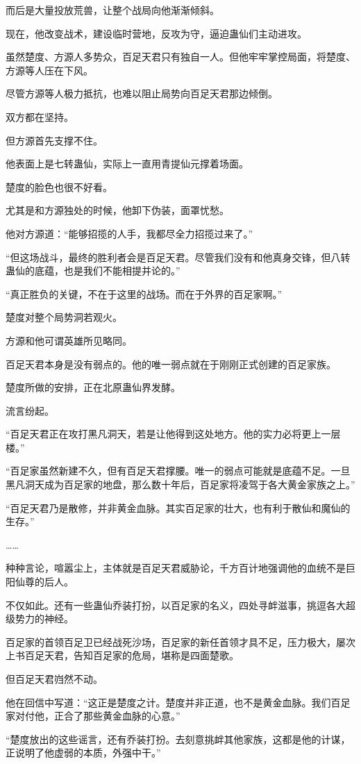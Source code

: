 \begin{this_body}
而后是大量投放荒兽，让整个战局向他渐渐倾斜。

现在，他改变战术，建设临时营地，反攻为守，逼迫蛊仙们主动进攻。

虽然楚度、方源人多势众，百足天君只有独自一人。但他牢牢掌控局面，将楚度、方源等人压在下风。

尽管方源等人极力抵抗，也难以阻止局势向百足天君那边倾倒。

双方都在坚持。

但方源首先支撑不住。

他表面上是七转蛊仙，实际上一直用青提仙元撑着场面。

楚度的脸色也很不好看。

尤其是和方源独处的时候，他卸下伪装，面罩忧愁。

他对方源道：“能够招揽的人手，我都尽全力招揽过来了。”

“但这场战斗，最终的胜利者会是百足天君。尽管我们没有和他真身交锋，但八转蛊仙的底蕴，也是我们不能相提并论的。”

“真正胜负的关键，不在于这里的战场。而在于外界的百足家啊。”

楚度对整个局势洞若观火。

方源和他可谓英雄所见略同。

百足天君本身是没有弱点的。他的唯一弱点就在于刚刚正式创建的百足家族。

楚度所做的安排，正在北原蛊仙界发酵。

流言纷起。

“百足天君正在攻打黑凡洞天，若是让他得到这处地方。他的实力必将更上一层楼。”

“百足家虽然新建不久，但有百足天君撑腰。唯一的弱点可能就是底蕴不足。一旦黑凡洞天成为百足家的地盘，那么数十年后，百足家将凌驾于各大黄金家族之上。”

“百足天君乃是散修，并非黄金血脉。其实百足家的壮大，也有利于散仙和魔仙的生存。”

……

种种言论，喧嚣尘上，主体就是百足天君威胁论，千方百计地强调他的血统不是巨阳仙尊的后人。

不仅如此。还有一些蛊仙乔装打扮，以百足家的名义，四处寻衅滋事，挑逗各大超级势力的神经。

百足家的首领百足卫已经战死沙场，百足家的新任首领才具不足，压力极大，屡次上书百足天君，告知百足家的危局，堪称是四面楚歌。

但百足天君岿然不动。

他在回信中写道：“这正是楚度之计。楚度并非正道，也不是黄金血脉。我们百足家对付他，正合了那些黄金血脉的心意。”

“楚度放出的这些谣言，还有乔装打扮。去刻意挑衅其他家族，这都是他的计谋，正说明了他虚弱的本质，外强中干。”


\end{this_body}
